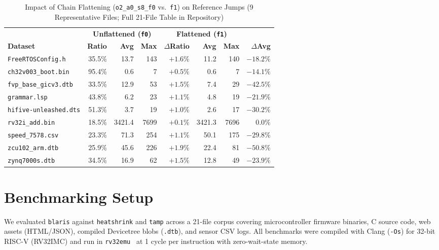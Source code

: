 \documentclass[10pt,twocolumn]{article}
\newcommand{\code}[1]{\texttt{#1}}
\begin{document}
\begin{table}[!t]
\centering
\caption{Impact of Chain Flattening (\code{o2\_a0\_s8\_f0} vs.\ \code{f1}) on
Reference Jumps (9 Representative Files; Full 21-File Table in Repository)}
\label{tab:jumps}
\scriptsize
\renewcommand{\arraystretch}{1.0}
\setlength{\tabcolsep}{1.3pt}
\begin{tabular}{@{}l r r r r r r r@{}}
\toprule
& \multicolumn{3}{c}{\textbf{Unflattened (\code{f0})}} & \multicolumn{3}{c}{\textbf{Flattened (\code{f1})}} & \\
\cmidrule(lr){2-4} \cmidrule(lr){5-7}
\textbf{Dataset} & \textbf{Ratio} & \textbf{Avg} & \textbf{Max} & \textbf{$\Delta$Ratio} & \textbf{Avg} & \textbf{Max} & \textbf{$\Delta$Avg} \\
\midrule
\code{FreeRTOSConfig.h}          &  35.5\% &   13.7 &  143 & $+1.6\%$ &   11.2 &  140 & $-18.2\%$ \\
\code{ch32v003\_boot.bin}        &  95.4\% &    0.6 &    7 & $+0.5\%$ &    0.6 &    7 & $-14.1\%$ \\
\code{fvp\_base\_gicv3.dtb}      &  33.5\% &   12.9 &   53 & $+1.5\%$ &    7.4 &   29 & $-42.5\%$ \\
\code{grammar.lsp}               &  43.8\% &    6.2 &   23 & $+1.1\%$ &    4.8 &   19 & $-21.9\%$ \\
\code{hifive-unleashed.dts}      &  51.3\% &    3.7 &   19 & $+1.0\%$ &    2.6 &   17 & $-30.2\%$ \\
\code{rv32i\_add.bin}            &  18.5\% & 3421.4 & 7699 & $+0.1\%$ & 3421.3 & 7696 & $0.0\%$   \\
\code{speed\_7578.csv}           &  23.3\% &   71.3 &  254 & $+1.1\%$ &   50.1 &  175 & $-29.8\%$ \\
\code{zcu102\_arm.dtb}           &  25.9\% &   45.6 &  226 & $+1.9\%$ &   22.4 &   81 & $-50.8\%$ \\
\code{zynq7000s.dtb}             &  34.5\% &   16.9 &   62 & $+1.5\%$ &   12.8 &   49 & $-23.9\%$ \\
\bottomrule
\end{tabular}
\end{table}

\section{Benchmarking Setup}
We evaluated \code{blaris} against \code{heatshrink} and \code{tamp} across a
21-file corpus covering microcontroller firmware binaries, C source code, web
assets (HTML/JSON), compiled Devicetree blobs (\code{.dtb}), and sensor CSV
logs. All benchmarks were compiled with Clang (\code{-Os}) for 32-bit RISC-V
(RV32IMC) and run in \code{rv32emu}~\cite{rv32emu} at 1 cycle per instruction
with zero-wait-state memory.
\end{document}
